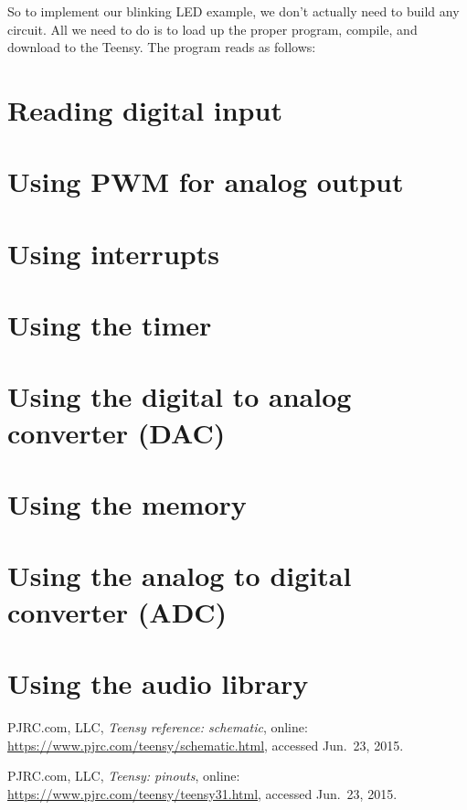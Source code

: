 \documentclass[letterpaper, 11pt]{article}
\begin{document}
So to implement our blinking LED example, we don't actually need to build any circuit. All we need to do is to load up the proper program, compile, and download to the Teensy. The program reads as follows: 


\section{Reading digital input}

\section{Using PWM for analog output}

\section{Using interrupts}

\section{Using the timer}

\section{Using the digital to analog converter (DAC)}

\section{Using the memory}

\section{Using the analog to digital converter (ADC)}

\section{Using the audio library}


\begin{thebibliography}{9}

  PJRC.com, LLC,
  \emph{Teensy reference: schematic},
	online: \url{https://www.pjrc.com/teensy/schematic.html}, accessed Jun.~23, 2015.

  PJRC.com, LLC,
  \emph{Teensy: pinouts},
	online: \url{https://www.pjrc.com/teensy/teensy31.html}, accessed Jun.~23, 2015.
  
\end{thebibliography}
\end{document}
